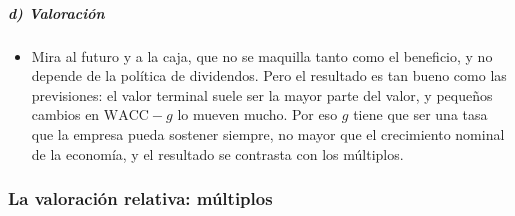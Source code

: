 \documentclass[11pt]{article}
\begin{document}
\subparagraph{d) Valoración}

\begin{itemize}
\item Mira al futuro y a la caja, que no se maquilla tanto como el beneficio, y no depende de la política de dividendos. Pero el resultado es tan bueno como las previsiones: el valor terminal suele ser la mayor parte del valor, y pequeños cambios en $\mathrm{WACC}-g$ lo mueven mucho. Por eso $g$ tiene que ser una tasa que la empresa pueda sostener siempre, no mayor que el crecimiento nominal de la economía, y el resultado se contrasta con los múltiplos.
\end{itemize}

\subsubsection{La valoración relativa: múltiplos}\label{sec:multiplos}
\end{document}
